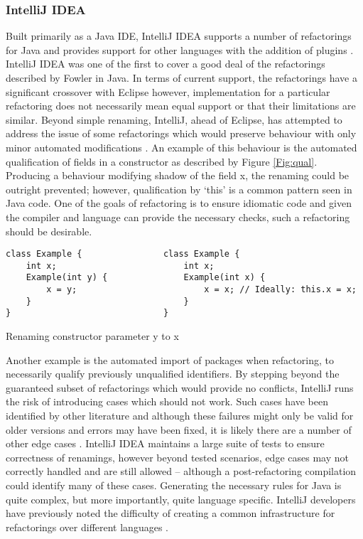 \subsubsection{IntelliJ IDEA}
Built primarily as a Java IDE, IntelliJ IDEA supports a number of refactorings for Java and provides support for other languages with the addition of plugins \cite{jetbrains15}. IntelliJ IDEA was one of the first to cover a good deal of the refactorings described by Fowler in Java. In terms of current support, the refactorings have a significant crossover with Eclipse however, implementation for a particular refactoring does not necessarily mean equal support or that their limitations are similar. Beyond simple renaming, IntelliJ, ahead of Eclipse, has attempted to address the issue of some refactorings which would preserve behaviour with only minor automated modifications \cite{schafer2010specification}. An example of this behaviour is the automated qualification of fields in a constructor as described by Figure \ref{Fig:qual}. Producing a behaviour modifying shadow of the field x, the renaming could be outright prevented; however, qualification by `this' is a common pattern seen in Java code. One of the goals of refactoring is to ensure idiomatic code and given the compiler and language can provide the necessary checks, such a refactoring should be desirable.

\begin{center}
\begin{fig}
\begin{verbatim}
class Example {                class Example {
    int x;                         int x;
    Example(int y) {               Example(int x) {
        x = y;                         x = x; // Ideally: this.x = x;
    }                              }
}                              }
\end{verbatim}
\caption{Renaming constructor parameter y to x}
\label{Fig:qual}
\end{fig}
\end{center}

Another example is the automated import of packages when refactoring, to necessarily qualify previously unqualified identifiers. By stepping beyond the guaranteed subset of refactorings which would provide no conflicts, IntelliJ runs the risk of introducing cases which should not work. Such cases have been identified by other literature and although these failures might only be valid for older versions and errors may have been fixed, it is likely there are a number of other edge cases \cite{jemerov2008implementing}. IntelliJ IDEA maintains a large suite of tests to ensure correctness of renamings, however beyond tested scenarios, edge cases may not correctly handled and are still allowed -- although a post-refactoring compilation could identify many of these cases. Generating the necessary rules for Java is quite complex, but more importantly, quite language specific. IntelliJ developers have previously noted the difficulty of creating a common infrastructure for refactorings over different languages \cite{jemerov2008implementing}.

